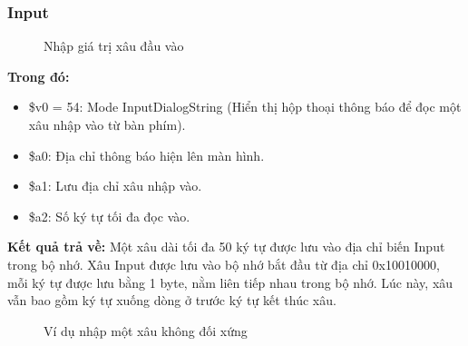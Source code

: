 \documentclass[a4paper,12pt]{article}
\begin{document}
\subsubsection{Input}
\begin{figure}[!h]
	\centerline{}
	\label{fig:bai6}
\end{figure}
\begin{figure}[!h]
	\centerline{}
	\caption{Nhập giá trị xâu đầu vào}
	\label{fig:bai6}
\end{figure}
\noindent
\textbf{Trong đó: }
\begin{itemize}
    \item \$v0 = 54: Mode InputDialogString (Hiển thị hộp thoại thông báo để đọc một xâu nhập vào từ bàn phím).
    \item \$a0: Địa chỉ thông báo hiện lên màn hình.
    \item \$a1: Lưu địa chỉ xâu nhập vào.
    \item \$a2: Số ký tự tối đa đọc vào.
\end{itemize}
\textbf{Kết quả trả về:} Một xâu dài tối đa 50 ký tự được lưu vào địa chỉ biến Input trong bộ nhớ. Xâu Input được lưu vào bộ nhớ bắt đầu từ địa chỉ 0x10010000, mỗi ký tự được lưu bằng 1 byte, nằm liên tiếp nhau trong bộ nhớ. Lúc này, xâu vẫn bao gồm ký tự xuống dòng ở trước ký tự kết thúc xâu.
\begin{figure}[!h]
	\centerline{}
	\caption{Ví dụ nhập một xâu không đối xứng}
	\label{fig:bai6}
\end{figure}
\end{document}
